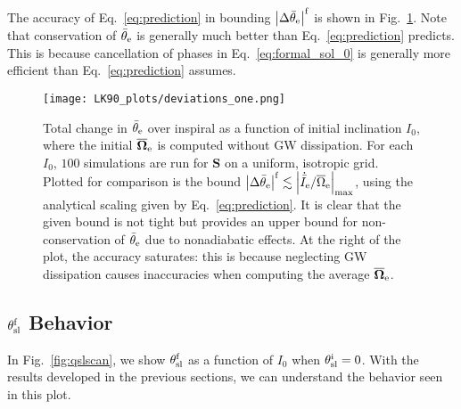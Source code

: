 \documentclass[
        twocolumn,
        twocolappendix
    ]{aastex63}
\newcommand*{\abs}[1]{\left|#1\right|}
\renewcommand*{\bm}[1]{\boldsymbol{\mathbf{#1}}}
\begin{document}
The accuracy of Eq.~\eqref{eq:prediction} in bounding $\abs{\Delta
\bar{\theta}_{\rm e}}^{\rm f}$ is shown in Fig.~\ref{fig:deviations}. Note that
conservation of $\bar{\theta}_{\rm e}$ is generally much better than
Eq.~\eqref{eq:prediction} predicts. This is because cancellation of phases in
Eq.~\eqref{eq:formal_sol_0} is generally more efficient than
Eq.~\eqref{eq:prediction} assumes.
\begin{figure}
    \centering
    \texttt{[image: LK90\_plots/deviations\_one.png]}
    \caption{Total change in $\bar{\theta}_{\rm e}$ over inspiral as a function of
    initial inclination $I_0$, where the initial $\bm{\overline{\Omega}}_{\rm
    e}$ is computed without GW dissipation. For each $I_0$, $100$ simulations
    are run for $\bm{S}$ on a uniform, isotropic grid. Plotted for comparison is
    the bound $\abs{\Delta \bar{\theta}_{\rm e}}^{\rm f} \lesssim
    \abs{\dot{\bar{I}}_{\rm e} /
    \overline{\Omega}_{\rm e}}_{\max}$, using the analytical scaling given by
    Eq.~\eqref{eq:prediction}. It is clear that the given bound is not tight but
    provides an upper bound for non-conservation of $\bar{\theta}_{\rm e}$ due to
    nonadiabatic effects. At the right of the plot, the accuracy saturates: this
    is because neglecting GW dissipation causes inaccuracies when computing the
    average $\bm{\overline{\Omega}}_{\rm e}$.}\label{fig:deviations}
\end{figure}

\subsection{$\theta_{\rm sl}^{\rm f}$ Behavior}\label{eq:effect}

In Fig.~\ref{fig:qslscan}, we show $\theta_{\rm sl}^{\rm f}$ as a function of
$I_0$ when $\theta_{\rm sl}^{\rm i} = 0$. With the results developed in the
previous sections, we can understand the behavior seen in this plot.
\end{document}
